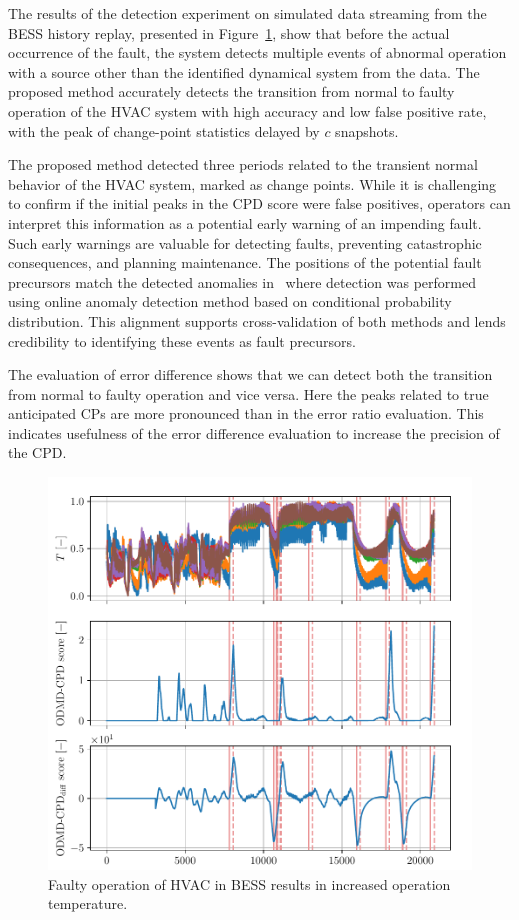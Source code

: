 The results of the detection experiment on simulated data streaming from the BESS history replay, presented in Figure~\ref{fig:bess}, show that before the actual occurrence of the fault, the system detects multiple events of abnormal operation with a source other than the identified dynamical system from the data. The proposed method accurately detects the transition from normal to faulty operation of the HVAC system with high accuracy and low false positive rate, with the peak of change-point statistics delayed by \(c\) snapshots.

The proposed method detected three periods related to the transient normal behavior of the HVAC system, marked as change points. While it is challenging to confirm if the initial peaks in the CPD score were false positives, operators can interpret this information as a potential early warning of an impending fault. Such early warnings are valuable for detecting faults, preventing catastrophic consequences, and planning maintenance. The positions of the potential fault precursors match the detected anomalies in~\citet{Wadinger2024} where detection was performed using online anomaly detection method based on conditional probability distribution. This alignment supports cross-validation of both methods and lends credibility to identifying these events as fault precursors.

The evaluation of error difference shows that we can detect both the transition from normal to faulty operation and vice versa. Here the peaks related to true anticipated CPs are more pronounced than in the error ratio evaluation. This indicates usefulness of the error difference evaluation to increase the precision of the CPD.

\begin{figure}[H]
    \centering
    \includegraphics[width=\linewidth]{figures/bess-chd_p10-l2880_b240_t240roll_2880-dmd_w1.0-hx20.pdf}
    \caption{Faulty operation of HVAC in BESS results in increased operation temperature.}\label{fig:bess}
\end{figure}

